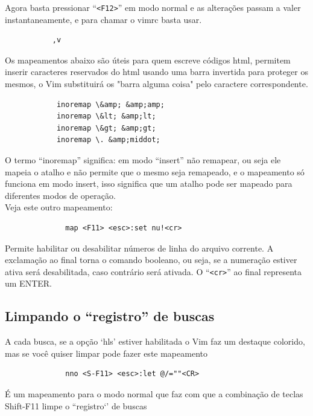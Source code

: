 \documentclass[10pt,a4paper,openany]{book}
\begin{document}
Agora basta pressionar ``\verb|<F12>|'' em modo normal e as alterações passam a valer
instantaneamente, e para chamar o vimrc basta usar.

\begin{verbatim}
		   ,v
\end{verbatim}



Os mapeamentos abaixo são úteis
para quem escreve códigos html, permitem inserir caracteres reservados do html
usando uma barra invertida para proteger os mesmos, o Vim substituirá os "barra
alguma coisa" pelo caractere correspondente.

\begin{verbatim}
			inoremap \&amp; &amp;amp;
			inoremap \&lt; &amp;lt;
			inoremap \&gt; &amp;gt;
			inoremap \. &amp;middot;
\end{verbatim}

O termo ``inoremap'' significa: em modo ``insert'' não remapear, ou seja
ele mapeia o atalho e não permite que o mesmo seja remapeado, e o
mapeamento só funciona em modo insert, isso significa que um atalho
pode ser mapeado para diferentes modos de operação. \\


Veja este outro mapeamento:

\begin{verbatim}
			  map <F11> <esc>:set nu!<cr>
\end{verbatim}

Permite habilitar ou desabilitar números de linha do arquivo corrente.
A exclamação ao final torna o comando booleano, ou seja, se a
numeração estiver ativa será desabilitada, caso contrário será
ativada. O ``\verb|<cr>|'' ao final representa um ENTER.

\subsection{Limpando o ``registro'' de buscas}\label{Limpando o ``registro'' de buscas}

A cada busca, se a opção `hls' estiver habilitada o Vim faz um
destaque colorido, mas se você quiser limpar pode fazer este
mapeamento

\begin{verbatim}
			  nno <S-F11> <esc>:let @/=""<CR>
\end{verbatim}

É um mapeamento para o modo normal que faz com que a combinação de
teclas Shift-F11 limpe o ``registro`' de buscas
\end{document}
